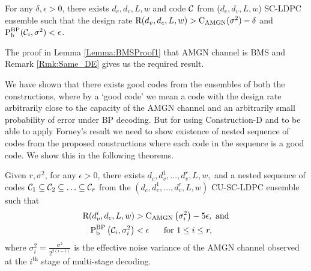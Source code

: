\documentclass[journal,draftcls,onecolumn,12pt,twoside]{IEEEtran}
\begin{document}
\begin{lemma}\label{Lemma:BMSProof2}
For any $\delta ,\epsilon>0$, there exists $d_{c},d_{v},L,w$ and code $\mathcal{C}$ from ($d_{c},d_{v},L,w$) SC-LDPC  ensemble such that the design rate $\text{R}(d_{v},d_{c},L,w)>\text{C}_{\text{AMGN}}(\sigma^{2})-\delta$ and $\text{P}_{\text{b}}^{\text{BP}}(\mathcal{C}_{i},\sigma^{2})< \epsilon$.

\end{lemma}
\begin{IEEEproof}
The proof in Lemma \ref{Lemma:BMSProof1} that AMGN channel is BMS and Remark \ref{Rmk:Same_DE} gives us the required result.
\end{IEEEproof}

We have shown that there exists good codes from the ensembles of both the constructions, where by a `good code' we mean a code with the design rate arbitrarily close to the capacity of the AMGN channel and an arbitrarily small probability of error under BP decoding. But for using Construction-D and to be able to apply Forney's result we need to show existence of nested sequence of codes from the proposed constructions where each code in the sequence is a good code. We show this in the following theorems.

\begin{lemma}\label{Lemma:NestedGoodCodes1}
Given $r,\sigma^{2}$, for any $\epsilon>0$, there exists $d_{c},d_{v}^{1},\ldots, d_{v}^{r},L,w,$ and a nested sequence of codes $\mathcal{C}_{1}\subseteq \mathcal{C}_{2}\subseteq\ldots \subseteq\mathcal{C}_{r}$ from the $(d_{c},d_{v}^{1},\ldots,d_{v}^{r},L,w)$ CU-SC-LDPC ensemble such that 
\begin{align}
\text{R}(d_{v}^{i},d_{c},L,w)&>\text{C}_{\text{AMGN}}\left(\sigma^{2}_{i}\right)-5\epsilon, \text{ and} \label{Eqn:RateConditions1}\\
\text{P}_{\text{b}}^{\text{BP}}\left(\mathcal{C}_{i},\sigma^{2}_{i}\right)&<\epsilon \hspace{0.5cm}\text{ for }1\leq i \leq r\label{Eqn:Error Prob1},
\end{align}
where $\sigma_{i}^{2}=\frac{\sigma^{2}}{2^{2(i-1)}}$ is the effective noise variance of the AMGN channel observed 	at the $i^{\text{th}}$ stage of multi-stage decoding.
\end{lemma}
\end{document}
